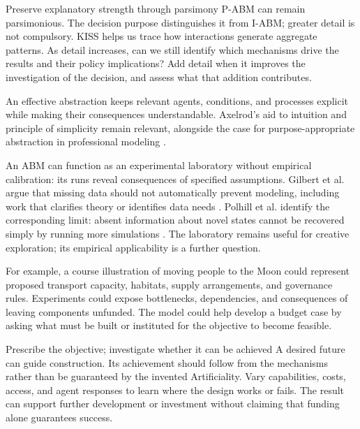 \documentclass[11pt,a4paper]{article}
\begin{document}
\begin{principle}{Preserve explanatory strength through parsimony}
P-ABM can remain parsimonious. The decision purpose distinguishes it from I-ABM; greater detail is not compulsory. KISS helps us trace how interactions generate aggregate patterns. As detail increases, can we still identify which mechanisms drive the results and their policy implications? Add detail when it improves the investigation of the decision, and assess what that addition contributes.

An effective abstraction keeps relevant agents, conditions, and processes explicit while making their consequences understandable. Axelrod's aid to intuition and principle of simplicity remain relevant, alongside the case for purpose-appropriate abstraction in professional modeling \cite{axelrod_complexity_1997}\cite[paras.~5.7--5.10]{gilbert_policy_2018}.
\end{principle}

An ABM can function as an experimental laboratory without empirical calibration: its runs reveal consequences of specified assumptions. Gilbert et al. argue that missing data should not automatically prevent modeling, including work that clarifies theory or identifies data needs \cite[paras.~4.4, 5.11--5.17]{gilbert_policy_2018}. Polhill et al. identify the corresponding limit: absent information about novel states cannot be recovered simply by running more simulations \cite[paras.~2.41--2.42]{polhill_prediction_2021}. The laboratory remains useful for creative exploration; its empirical applicability is a further question.

For example, a course illustration of moving people to the Moon could represent proposed transport capacity, habitats, supply arrangements, and governance rules. Experiments could expose bottlenecks, dependencies, and consequences of leaving components unfunded. The model could help develop a budget case by asking what must be built or instituted for the objective to become feasible.

\begin{principle}{Prescribe the objective; investigate whether it can be achieved}
A desired future can guide construction. Its achievement should follow from the mechanisms rather than be guaranteed by the invented Artificiality. Vary capabilities, costs, access, and agent responses to learn where the design works or fails. The result can support further development or investment without claiming that funding alone guarantees success.
\end{principle}
\end{document}
